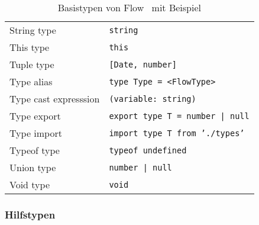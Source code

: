 \begin{table}[tbp]
\begin{tabularx}{\textwidth}{@{}ll@{}}
    String type                & \texttt{string}                          \\
    This type                  & \texttt{this}                            \\
    Tuple type                 & \texttt{{[}Date, number{]}}              \\
    Type alias                 & \texttt{type Type = <{}FlowType>{}}      \\
    Type cast expresssion      & \texttt{(variable: string)}              \\
    Type export                & \texttt{export type T = number | null}   \\
    Type import                & \texttt{import type T from './types'}    \\
    Typeof type                & \texttt{typeof undefined}                \\
    Union type                 & \texttt{number | null}                   \\
    Void type                  & \texttt{void}                            \\
    \midrule
  \end{tabularx}
  \caption{Basistypen von Flow~\autocite{FLOW:TYPE_ANNOTATIONS} mit Beispiel}
  \label{tab:flow-base-types}
\end{table}



\subsubsection{Hilfstypen}

